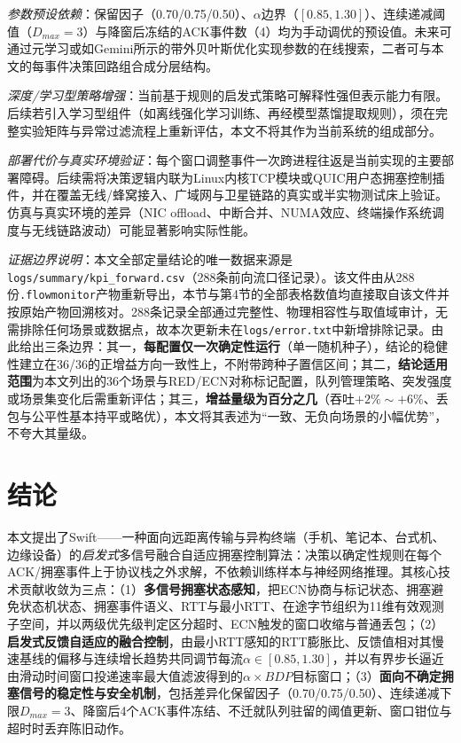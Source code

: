 \documentclass[10pt,twocolumn]{article}
\begin{document}
\textit{参数预设依赖}：保留因子（0.70/0.75/0.50）、$\alpha$边界（$[0.85,1.30]$）、连续递减阈值（$D_{max}=3$）与降窗后冻结的ACK事件数（4）均为手动调优的预设值。未来可通过元学习\cite{meta_learning}或如Gemini\cite{gemini}所示的带外贝叶斯优化实现参数的在线搜索，二者可与本文的每事件决策回路组合成分层结构。

\textit{深度/学习型策略增强}：当前基于规则的启发式策略可解释性强但表示能力有限。后续若引入学习型组件（如离线强化学习训练、再经模型蒸馏提取规则），须在完整实验矩阵与异常过滤流程上重新评估，本文不将其作为当前系统的组成部分。

\textit{部署代价与真实环境验证}：每个窗口调整事件一次跨进程往返是当前实现的主要部署障碍。后续需将决策逻辑内联为Linux内核TCP模块或QUIC用户态拥塞控制插件，并在覆盖无线/蜂窝接入、广域网与卫星链路的真实或半实物测试床上验证。仿真与真实环境的差异（NIC offload、中断合并、NUMA效应、终端操作系统调度与无线链路波动）可能显著影响实际性能。

\textit{证据边界说明}：本文全部定量结论的唯一数据来源是\texttt{logs/summary/kpi\_forward.csv}（288条前向流口径记录）。该文件由从288份\texttt{.flowmonitor}产物重新导出，本节与第4节的全部表格数值均直接取自该文件并按原始产物回溯核对。288条记录全部通过完整性、物理相容性与取值域审计，无需排除任何场景或数据点，故本次更新未在\texttt{logs/error.txt}中新增排除记录。由此给出三条边界：其一，\textbf{每配置仅一次确定性运行}（单一随机种子），结论的稳健性建立在36/36的正增益方向一致性上，不附带跨种子置信区间；其二，\textbf{结论适用范围}为本文列出的36个场景与RED/ECN对称标记配置，队列管理策略、突发强度或场景集变化后需重新评估；其三，\textbf{增益量级为百分之几}（吞吐$+2\%\sim+6\%$、丢包与公平性基本持平或略优），本文将其表述为“一致、无负向场景的小幅优势”，不夸大其量级。


\section{结论}

本文提出了Swift——一种面向远距离传输与异构终端（手机、笔记本、台式机、边缘设备）的\emph{启发式}多信号融合自适应拥塞控制算法：决策以确定性规则在每个ACK/拥塞事件上于协议栈之外求解，不依赖训练样本与神经网络推理。其核心技术贡献收敛为三点：（1）\textbf{多信号拥塞状态感知}，把ECN协商与标记状态、拥塞避免状态机状态、拥塞事件语义、RTT与最小RTT、在途字节组织为11维有效观测子空间，并以两级优先级判定区分超时、ECN触发的窗口收缩与普通丢包；（2）\textbf{启发式反馈自适应的融合控制}，由最小RTT感知的RTT膨胀比、反馈值相对其慢速基线的偏移与连续增长趋势共同调节每流$\alpha \in [0.85,1.30]$，并以有界步长逼近由滑动时间窗口投递速率最大值滤波得到的$\alpha \times BDP$目标窗口；（3）\textbf{面向不确定拥塞信号的稳定性与安全机制}，包括差异化保留因子（0.70/0.75/0.50）、连续递减下限$D_{max}=3$、降窗后4个ACK事件冻结、不迁就队列驻留的阈值更新、窗口钳位与超时时丢弃陈旧动作。
\end{document}
